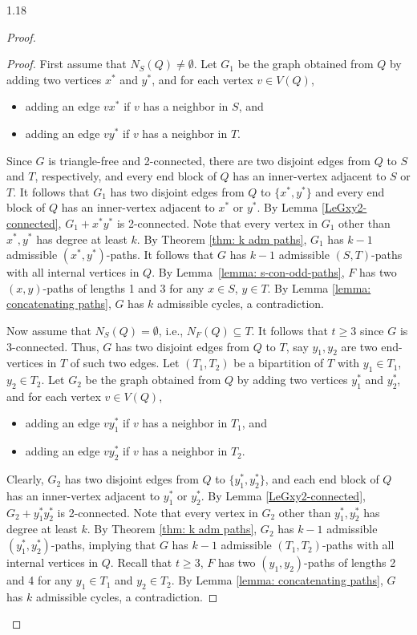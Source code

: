 \documentclass[10pt]{article}
\begin{document}
\begin{spacing}{1.18}
\begin{proof}
\begin{proof}
    First assume that $N_S(Q)\neq \emptyset$. Let $G_1$ be the graph obtained from $Q$ by adding two vertices $x^*$ and $y^*$, and for each vertex $v\in V(Q)$, 
    \begin{itemize}
	    \item[(1)] adding an edge $vx^*$ if $v$ has a neighbor in $S$, and
        \item[(2)] adding an edge $vy^*$ if $v$ has a neighbor in $T$.
    \end{itemize}
    Since $G$ is triangle-free and 2-connected, there are two disjoint edges from $Q$ to $S$ and $T$, respectively, and every end block of $Q$ has an inner-vertex adjacent to $S$ or $T$. It follows that $G_1$ has two disjoint edges from $Q$ to $\{x^*,y^*\}$ and every end block of $Q$ has an inner-vertex adjacent to $x^*$ or $y^*$. By Lemma \ref{LeGxy2-connected}, $G_1+x^*y^*$ is 2-connected. Note that every vertex in $G_1$ other than $x^*,y^*$ has degree at least $k$. By Theorem \ref{thm: k adm paths}, $G_1$ has $k-1$ admissible $(x^*,y^*)$-paths. It follows that $G$ has $k-1$ admissible $(S,T)$-paths with all internal vertices in $Q$. By Lemma~\ref{lemma: s-con-odd-paths}, $F$ has two $(x,y)$-paths of lengths 1 and 3 for any $x\in S$, $y\in T$. By Lemma \ref{lemma: concatenating paths}, $G$ has $k$ admissible cycles, a contradiction. 
    
    Now assume that $N_S(Q)=\emptyset$, i.e., $N_F(Q)\subseteq T$. It follows that $t\geqslant3$ since $G$ is 3-connected. Thus, $G$ has two disjoint edges from $Q$ to $T$, say $y_1,y_2$ are two end-vertices in $T$ of such two edges. Let $(T_1,T_2)$ be a bipartition of $T$ with $y_1\in T_1$, $y_2\in T_2$. Let $G_2$ be the graph obtained from $Q$ by adding two vertices $y_1^*$ and $y_2^*$, and for each vertex $v\in V(Q)$, 
    \begin{itemize}
	      \item[(1)] adding an edge $vy_1^*$ if $v$ has a neighbor in $T_1$, and
        \item[(2)] adding an edge $vy_2^*$ if $v$ has a neighbor in $T_2$.
    \end{itemize}
    Clearly, $G_2$ has two disjoint edges from $Q$ to $\{y_1^*,y_2^*\}$, and each end block of $Q$ has an inner-vertex adjacent to $y_1^*$ or $y_2^*$. By Lemma \ref{LeGxy2-connected}, $G_2+y_1^*y_2^*$ is 2-connected. Note that every vertex in $G_2$ other than $y_1^*,y_2^*$ has degree at least $k$. By Theorem \ref{thm: k adm paths}, $G_2$ has $k-1$ admissible $(y_1^*,y_2^*)$-paths, implying that $G$ has $k-1$ admissible $(T_1,T_2)$-paths with all internal vertices in $Q$. Recall that $t\geqslant3$, $F$ has two $(y_1,y_2)$-paths of lengths 2 and 4 for any $y_1\in T_1$ and $y_2\in T_2$. By Lemma \ref{lemma: concatenating paths}, $G$ has $k$ admissible cycles, a contradiction. 
\end{proof}


\end{proof}
\end{spacing}
\end{document}

